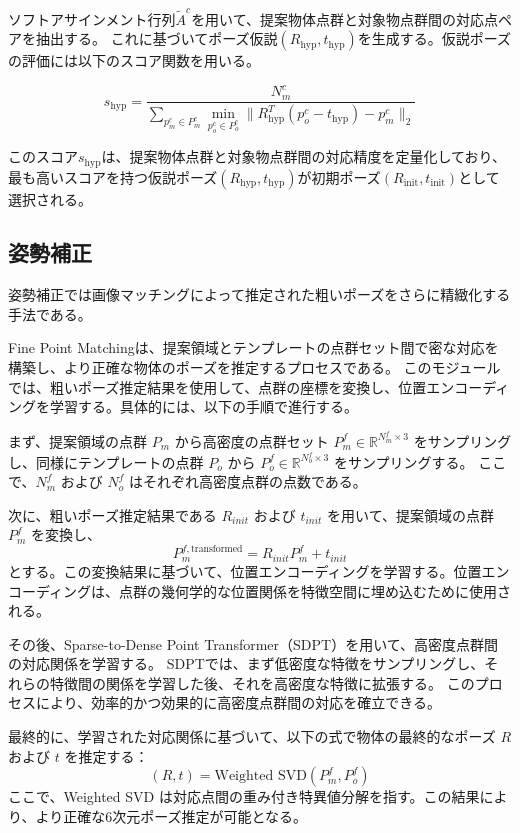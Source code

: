 ソフトアサインメント行列$\tilde{A}^c$を用いて、提案物体点群と対象物点群間の対応点ペアを抽出する。
これに基づいてポーズ仮説$(R_{\text{hyp}}, t_{\text{hyp}})$を生成する。仮説ポーズの評価には以下のスコア関数を用いる。

\[
s_{\text{hyp}} = \frac{N_m^c}{\sum_{p_m^c \in P_m^c} \min_{p_o^c \in P_o^c} \| R_{\text{hyp}}^T (p_o^c - t_{\text{hyp}}) - p_m^c \|_2 }
\]

このスコア$s_{\text{hyp}}$は、提案物体点群と対象物点群間の対応精度を定量化しており、最も高いスコアを持つ仮説ポーズ$(R_{\text{hyp}}, t_{\text{hyp}})$が初期ポーズ$(R_{\text{init}}, t_{\text{init}})$として選択される。%


\subsection{姿勢補正}
姿勢補正では画像マッチングによって推定された粗いポーズをさらに精緻化する手法である。

Fine Point Matchingは、提案領域とテンプレートの点群セット間で密な対応を構築し、より正確な物体のポーズを推定するプロセスである。
このモジュールでは、粗いポーズ推定結果を使用して、点群の座標を変換し、位置エンコーディングを学習する。具体的には、以下の手順で進行する。

まず、提案領域の点群 $P_m$ から高密度の点群セット $P_m^f \in \mathbb{R}^{N_m^f \times 3}$ をサンプリングし、同様にテンプレートの点群 $P_o$ から $P_o^f \in \mathbb{R}^{N_o^f \times 3}$ をサンプリングする。
ここで、$N_m^f$ および $N_o^f$ はそれぞれ高密度点群の点数である。

次に、粗いポーズ推定結果である $R_{init}$ および $t_{init}$ を用いて、提案領域の点群 $P_m^f$ を変換し、
\[
P_m^{f, \text{transformed}} = R_{init} P_m^f + t_{init}
\]
とする。この変換結果に基づいて、位置エンコーディングを学習する。位置エンコーディングは、点群の幾何学的な位置関係を特徴空間に埋め込むために使用される。

その後、Sparse-to-Dense Point Transformer（SDPT）を用いて、高密度点群間の対応関係を学習する。
SDPTでは、まず低密度な特徴をサンプリングし、それらの特徴間の関係を学習した後、それを高密度な特徴に拡張する。
このプロセスにより、効率的かつ効果的に高密度点群間の対応を確立できる。

最終的に、学習された対応関係に基づいて、以下の式で物体の最終的なポーズ $R$ および $t$ を推定する：
\[
(R, t) = \text{Weighted SVD}(P_m^f, P_o^f)
\]
ここで、Weighted SVD は対応点間の重み付き特異値分解を指す。この結果により、より正確な6次元ポーズ推定が可能となる。


